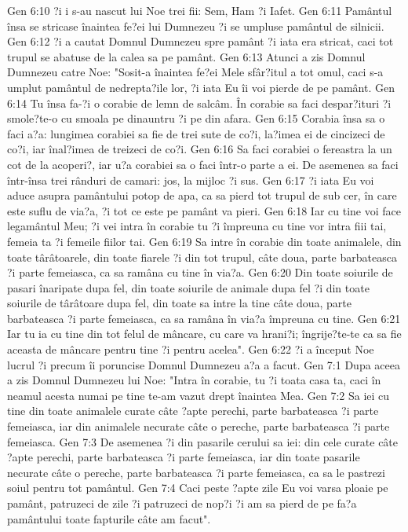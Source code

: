 Gen 6:10  ?i i s-au nascut lui Noe trei fii: Sem, Ham ?i Iafet.
Gen 6:11  Pamântul însa se stricase înaintea fe?ei lui Dumnezeu ?i se umpluse pamântul de silnicii.
Gen 6:12  ?i a cautat Domnul Dumnezeu spre pamânt ?i iata era stricat, caci tot trupul se abatuse de la calea sa pe pamânt.
Gen 6:13  Atunci a zis Domnul Dumnezeu catre Noe: "Sosit-a înaintea fe?ei Mele sfâr?itul a tot omul, caci s-a umplut pamântul de nedrepta?ile lor, ?i iata Eu îi voi pierde de pe pamânt.
Gen 6:14  Tu însa fa-?i o corabie de lemn de salcâm. În corabie sa faci despar?ituri ?i smole?te-o cu smoala pe dinauntru ?i pe din afara.
Gen 6:15  Corabia însa sa o faci a?a: lungimea corabiei sa fie de trei sute de co?i, la?imea ei de cincizeci de co?i, iar înal?imea de treizeci de co?i.
Gen 6:16  Sa faci corabiei o fereastra la un cot de la acoperi?, iar u?a corabiei sa o faci într-o parte a ei. De asemenea sa faci într-însa trei rânduri de camari: jos, la mijloc ?i sus.
Gen 6:17  ?i iata Eu voi aduce asupra pamântului potop de apa, ca sa pierd tot trupul de sub cer, în care este suflu de via?a, ?i tot ce este pe pamânt va pieri.
Gen 6:18  Iar cu tine voi face legamântul Meu; ?i vei intra în corabie tu ?i împreuna cu tine vor intra fiii tai, femeia ta ?i femeile fiilor tai.
Gen 6:19  Sa intre în corabie din toate animalele, din toate târâtoarele, din toate fiarele ?i din tot trupul, câte doua, parte barbateasca ?i parte femeiasca, ca sa ramâna cu tine în via?a.
Gen 6:20  Din toate soiurile de pasari înaripate dupa fel, din toate soiurile de animale dupa fel ?i din toate soiurile de târâtoare dupa fel, din toate sa intre la tine câte doua, parte barbateasca ?i parte femeiasca, ca sa ramâna în via?a împreuna cu tine.
Gen 6:21  Iar tu ia cu tine din tot felul de mâncare, cu care va hrani?i; îngrije?te-te ca sa fie aceasta de mâncare pentru tine ?i pentru acelea".
Gen 6:22  ?i a început Noe lucrul ?i precum îi poruncise Domnul Dumnezeu a?a a facut.
Gen 7:1  Dupa aceea a zis Domnul Dumnezeu lui Noe: "Intra în corabie, tu ?i toata casa ta, caci în neamul acesta numai pe tine te-am vazut drept înaintea Mea.
Gen 7:2  Sa iei cu tine din toate animalele curate câte ?apte perechi, parte barbateasca ?i parte femeiasca, iar din animalele necurate câte o pereche, parte barbateasca ?i parte femeiasca.
Gen 7:3  De asemenea ?i din pasarile cerului sa iei: din cele curate câte ?apte perechi, parte barbateasca ?i parte femeiasca, iar din toate pasarile necurate câte o pereche, parte barbateasca ?i parte femeiasca, ca sa le pastrezi soiul pentru tot pamântul.
Gen 7:4  Caci peste ?apte zile Eu voi varsa ploaie pe pamânt, patruzeci de zile ?i patruzeci de nop?i ?i am sa pierd de pe fa?a pamântului toate fapturile câte am facut".

